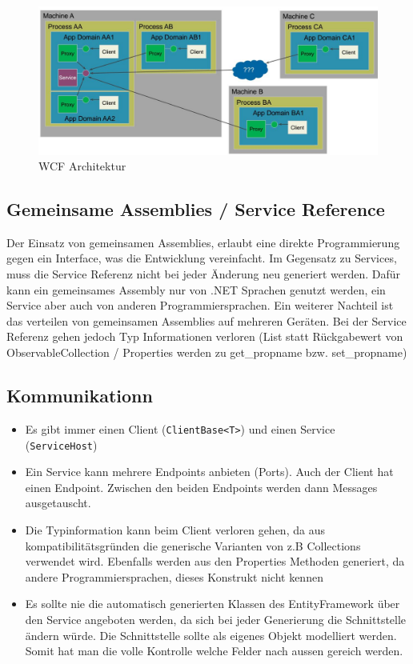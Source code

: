 \documentclass[
a4paper,
oneside,
10pt,
fleqn,
headsepline,
toc=listofnumbered, 
bibliography=totocnumbered]{scrartcl}
\begin{document}
\begin{figure}[h]
\centering
\includegraphics[width=0.8\linewidth]{images/wcf_architecture}
\caption{WCF Architektur}
\label{fig:wcfarchitecture}
\end{figure}

\subsection{Gemeinsame Assemblies / Service Reference}
Der Einsatz von gemeinsamen Assemblies, erlaubt eine direkte Programmierung gegen ein Interface, was die Entwicklung vereinfacht. Im Gegensatz zu Services, muss die Service Referenz nicht bei jeder Änderung neu generiert werden. Dafür kann ein gemeinsames Assembly nur von .NET Sprachen genutzt werden, ein Service aber auch von anderen Programmiersprachen. Ein weiterer Nachteil ist das verteilen von gemeinsamen Assemblies auf mehreren Geräten.
Bei der Service Referenz gehen jedoch Typ Informationen verloren (List statt Rückgabewert von ObservableCollection / Properties werden zu get\_propname bzw. set\_propname)

\subsection{Kommunikationn}
\begin{itemize}
	\item Es gibt immer einen Client (\lstinline|ClientBase<T>|) und einen Service (\lstinline|ServiceHost|)
	\item Ein Service kann mehrere Endpoints anbieten (Ports). Auch der Client hat einen Endpoint. Zwischen den beiden Endpoints werden dann Messages ausgetauscht. 
	\item Die Typinformation kann beim Client verloren gehen, da aus kompatibilitätsgründen die generische Varianten von z.B Collections verwendet wird. Ebenfalls werden aus den Properties Methoden generiert, da andere Programmiersprachen, dieses Konstrukt nicht kennen
	\item Es sollte nie die automatisch generierten Klassen des EntityFramework über den Service angeboten werden, da sich bei jeder Generierung die Schnittstelle ändern würde. Die Schnittstelle sollte als eigenes Objekt modelliert werden. Somit hat man die volle Kontrolle welche Felder nach aussen gereich werden. 
\end{itemize}
\end{document}
